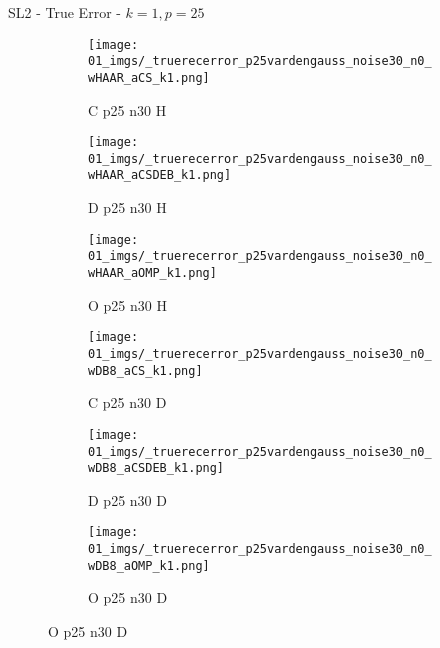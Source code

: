 \begin{frame}{SL2 - True Error - $k=1,p=25$}{}
\begin{figure}
\vspace{5pt}

\begin{subfigure}{0.13\textwidth}
\texttt{[image: 01\_imgs/\_truerecerror\_p25vardengauss\_noise30\_n0\_wHAAR\_aCS\_k1.png]}
\caption*{\tiny C p25 n30 H}
\end{subfigure}
\begin{subfigure}{0.13\textwidth}
\texttt{[image: 01\_imgs/\_truerecerror\_p25vardengauss\_noise30\_n0\_wHAAR\_aCSDEB\_k1.png]}
\caption*{\tiny D p25 n30 H}
\end{subfigure}
\begin{subfigure}{0.13\textwidth}
\texttt{[image: 01\_imgs/\_truerecerror\_p25vardengauss\_noise30\_n0\_wHAAR\_aOMP\_k1.png]}
\caption*{\tiny O p25 n30 H}
\end{subfigure}
\begin{subfigure}{0.13\textwidth}
\texttt{[image: 01\_imgs/\_truerecerror\_p25vardengauss\_noise30\_n0\_wDB8\_aCS\_k1.png]}
\caption*{\tiny C p25 n30 D}
\end{subfigure}
\begin{subfigure}{0.13\textwidth}
\texttt{[image: 01\_imgs/\_truerecerror\_p25vardengauss\_noise30\_n0\_wDB8\_aCSDEB\_k1.png]}
\caption*{\tiny D p25 n30 D}
\end{subfigure}
\begin{subfigure}{0.13\textwidth}
\texttt{[image: 01\_imgs/\_truerecerror\_p25vardengauss\_noise30\_n0\_wDB8\_aOMP\_k1.png]}
\caption*{\tiny O p25 n30 D}
\end{subfigure}
\end{figure}
\end{frame}

